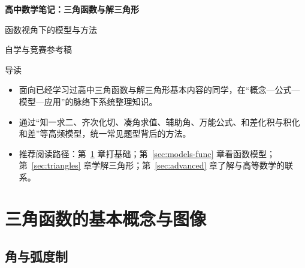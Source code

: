 \documentclass[a4paper,11pt]{ctexart}
\renewcommand{\notetitle}{高中数学笔记：三角函数与解三角形}
\renewcommand{\noteauthor}{自学与竞赛参考稿}
\renewcommand{\notesubtitle}{函数视角下的模型与方法}
\begin{document}
\thispagestyle{empty}

\setcounter{page}{1}

\noindent
\begin{minipage}[t][0.7\textheight][c]{\textwidth}
  \raggedleft
  \vspace*{\fill}
  {\sffamily\bfseries\Huge\color{accent}\notetitle\par}
  \vspace{0.6em}
  {\Large\color{inkgray}\notesubtitle\par}
  \vspace{0.5em}
  {\large\color{inkgray}\noteauthor\par}
  \vspace{0.4em}
  \MathNoteVersionBlock
  \vspace*{\fill}
\end{minipage}

\begin{center}
\begin{minipage}{0.82\textwidth}
\textcolor{inkgray}{\sffamily\small 导读}\\
\begin{itemize}
  \item 面向已经学习过高中三角函数与解三角形基本内容的同学，在“概念—公式—模型—应用”的脉络下系统整理知识。
  \item 通过“知一求二、齐次化切、凑角求值、辅助角、万能公式、和差化积与积化和差”等高频模型，统一常见题型背后的方法。
  \item 推荐阅读路径：第~\ref{sec:basic} 章打基础；第~\ref{sec:models-func} 章看函数模型；第~\ref{sec:triangles} 章学解三角形；第~\ref{sec:advanced} 章了解与高等数学的联系。
\end{itemize}
\end{minipage}
\end{center}
\vspace{1em}

\clearpage
\thispagestyle{plain}
\tableofcontents

\clearpage
\fi

\section{三角函数的基本概念与图像}
\label{sec:basic}

\subsection{角与弧度制}
\end{document}
